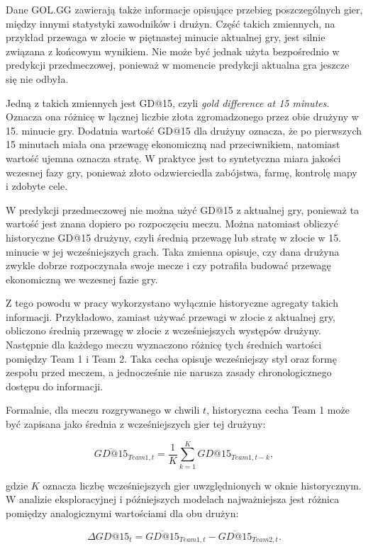 Dane GOL.GG zawierają także informacje opisujące przebieg poszczególnych gier, między innymi statystyki zawodników i drużyn. Część takich zmiennych, na przykład przewaga w złocie w piętnastej minucie aktualnej gry, jest silnie związana z końcowym wynikiem. Nie może być jednak użyta bezpośrednio w predykcji przedmeczowej, ponieważ w momencie predykcji aktualna gra jeszcze się nie odbyła.

Jedną z takich zmiennych jest GD@15, czyli \textit{gold difference at 15 minutes}. Oznacza ona różnicę w łącznej liczbie złota zgromadzonego przez obie drużyny w 15. minucie gry. Dodatnia wartość GD@15 dla drużyny oznacza, że po pierwszych 15 minutach miała ona przewagę ekonomiczną nad przeciwnikiem, natomiast wartość ujemna oznacza stratę. W praktyce jest to syntetyczna miara jakości wczesnej fazy gry, ponieważ złoto odzwierciedla zabójstwa, farmę, kontrolę mapy i zdobyte cele.

W predykcji przedmeczowej nie można użyć GD@15 z aktualnej gry, ponieważ ta wartość jest znana dopiero po rozpoczęciu meczu. Można natomiast obliczyć historyczne GD@15 drużyny, czyli średnią przewagę lub stratę w złocie w 15. minucie w jej wcześniejszych grach. 
Taka zmienna opisuje, czy dana drużyna zwykle dobrze rozpoczynała swoje mecze i czy potrafiła budować przewagę ekonomiczną we wczesnej fazie gry.

Z tego powodu w pracy wykorzystano wyłącznie historyczne agregaty takich informacji. Przykładowo, zamiast używać przewagi w złocie z aktualnej gry, obliczono średnią przewagę w złocie z wcześniejszych występów drużyny. Następnie dla każdego meczu wyznaczono różnicę tych średnich wartości pomiędzy Team 1 i Team 2. 
Taka cecha opisuje wcześniejszy styl oraz formę zespołu przed meczem, a jednocześnie nie narusza zasady chronologicznego dostępu do informacji.

Formalnie, dla meczu rozgrywanego w chwili \(t\), historyczna cecha Team 1 może być zapisana jako średnia z wcześniejszych gier tej drużyny:

\begin{equation}
    \overline{GD@15}_{Team1,t} = \frac{1}{K}\sum_{k=1}^{K} GD@15_{Team1,t-k},
\end{equation}

gdzie \(K\) oznacza liczbę wcześniejszych gier uwzględnionych w oknie historycznym. W analizie eksploracyjnej i późniejszych modelach najważniejsza jest różnica pomiędzy analogicznymi wartościami dla obu drużyn:

\begin{equation}
    \Delta GD@15_t = \overline{GD@15}_{Team1,t} - \overline{GD@15}_{Team2,t}.
\end{equation}

